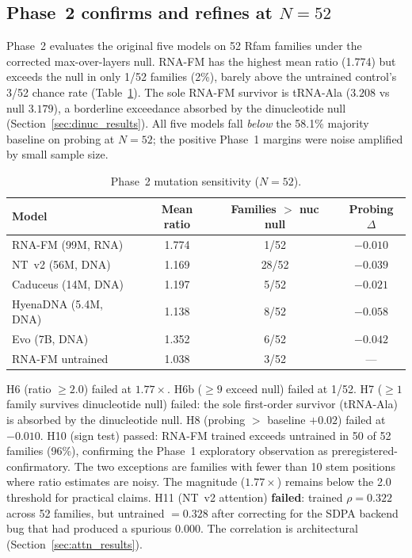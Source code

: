 \documentclass[11pt]{article}
\begin{document}
\subsection{Phase~2 confirms and refines at $N = 52$}
\label{sec:phase2}

Phase~2 evaluates the original five models on 52 Rfam families under
the corrected max-over-layers null.  RNA-FM has the highest mean ratio
(1.774) but exceeds the null in only 1/52 families (2\%), barely above
the untrained control's 3/52 chance rate
(Table~\ref{tab:phase2_summary}).  The sole RNA-FM survivor is
tRNA-Ala ($3.208$ vs null $3.179$), a borderline exceedance absorbed
by the dinucleotide null (Section~\ref{sec:dinuc_results}).  All five
models fall \emph{below} the 58.1\% majority baseline on probing at
$N = 52$; the positive Phase~1 margins were noise amplified by small
sample size.

\begin{table}[t]
\centering
\caption{Phase~2 mutation sensitivity ($N = 52$).}
\label{tab:phase2_summary}
\begin{tabular}{@{}lccc@{}}
\toprule
\textbf{Model} & \textbf{Mean ratio} &
  \textbf{Families $>$ nuc null} & \textbf{Probing $\Delta$} \\
\midrule
RNA-FM (99M, RNA)         & 1.774 & 1/52  & $-0.010$ \\
NT~v2 (56M, DNA)          & 1.169 & 28/52 & $-0.039$ \\
Caduceus (14M, DNA)       & 1.197 & 5/52  & $-0.021$ \\
HyenaDNA (5.4M, DNA)      & 1.138 & 8/52  & $-0.058$ \\
Evo (7B, DNA)             & 1.352 & 6/52  & $-0.042$ \\
RNA-FM untrained          & 1.038 & 3/52  & --- \\
\bottomrule
\end{tabular}
\end{table}

H6 (ratio $\geq 2.0$) failed at $1.77\times$.  H6b ($\geq 9$ exceed
null) failed at 1/52.  H7 ($\geq 1$ family survives dinucleotide
null) failed: the sole first-order survivor (tRNA-Ala) is absorbed by
the dinucleotide null.  H8 (probing $>$ baseline $+ 0.02$) failed at
$-0.010$.  H10 (sign test) passed: RNA-FM trained exceeds untrained in
50 of 52 families (96\%), confirming the Phase~1 exploratory
observation as preregistered-confirmatory.  The two exceptions are
families with fewer than 10 stem positions where ratio estimates are
noisy.  The magnitude ($1.77\times$) remains below the 2.0 threshold
for practical claims.  H11 (NT~v2 attention) \textbf{failed}: trained $\rho =
0.322$ across 52 families, but untrained $= 0.328$ after correcting
for the SDPA backend bug that had produced a spurious $0.000$.  The
correlation is architectural (Section~\ref{sec:attn_results}).
\end{document}
